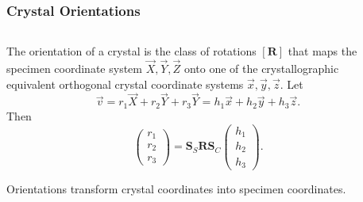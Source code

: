 \begin{frame}

\frametitle{Crystal Orientations}

  \begin{columns}

    \begin{column}{6.3cm}

      The \alert{orientation} of a crystal is the class of rotations $[\mathbf
      R]$ that maps the specimen coordinate system $\vec X, \vec Y, \vec Z$
      onto one of the crystallographic equivalent orthogonal crystal
      coordinate systems $\vec x, \vec y, \vec z$.
      Let
      \begin{equation*}
        \vec v = r_{1} \vec X + r_{2} \vec Y + r_{3} \vec Y
               = h_{1} \vec x + h_{2} \vec y + h_{3} \vec z.
      \end{equation*}
      Then
      \begin{equation*}
        \left(
        \begin{matrix}
          r_{1}\\r_{2}\\r_{3}
        \end{matrix}
        \right)
        =
        \mathbf S_{S} \mathbf R \mathbf S_{C}
                \left(
        \begin{matrix}
          h_{1}\\h_{2}\\h_{3}
        \end{matrix}
        \right).
      \end{equation*}


      \alert{Orientations transform crystal coordinates into specimen coordinates.}

    \end{column}

    \begin{column}{5cm}

\end{column}
\end{columns}
\end{frame}
